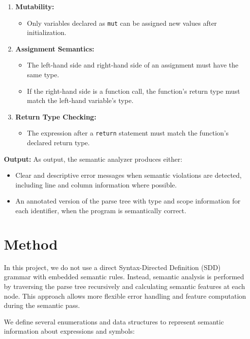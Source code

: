\documentclass[12pt, a4paper]{report}
\begin{document}
\begin{enumerate}
    \item \textbf{Mutability:}
    \begin{itemize}
        \item Only variables declared as \texttt{mut} can be assigned new values after initialization.
    \end{itemize}

    \item \textbf{Assignment Semantics:}
    \begin{itemize}
        \item The left-hand side and right-hand side of an assignment must have the same type.
        \item If the right-hand side is a function call, the function's return type must match the left-hand variable’s type.
    \end{itemize}

    \item \textbf{Return Type Checking:}
    \begin{itemize}
        \item The expression after a \texttt{return} statement must match the function's declared return type.
    \end{itemize}
\end{enumerate}

\textbf{Output:}  
As output, the semantic analyzer produces either:
\begin{itemize}
    \item Clear and descriptive error messages when semantic violations are detected, including line and column information where possible.
    \item An annotated version of the parse tree with type and scope information for each identifier, when the program is semantically correct.
\end{itemize}


\section{Method}

In this project, we do not use a direct Syntax-Directed Definition (SDD) grammar with embedded semantic rules. Instead, semantic analysis is performed by traversing the parse tree recursively and calculating semantic features at each node. This approach allows more flexible error handling and feature computation during the semantic pass.

We define several enumerations and data structures to represent semantic information about expressions and symbols:
\end{document}
